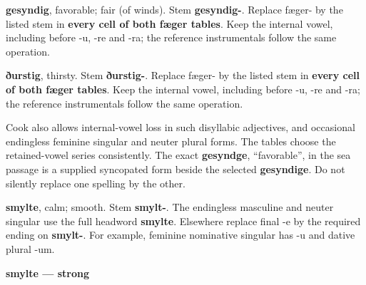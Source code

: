 \textbf{gesyndig}, favorable; fair (of winds). Stem \textbf{gesyndig-}. Replace fæger- by the listed stem in \textbf{every cell of both fæger tables}. Keep the internal vowel, including before -u, -re and -ra; the reference instrumentals follow the same operation.

\textbf{ðurstig}, thirsty. Stem \textbf{ðurstig-}. Replace fæger- by the listed stem in \textbf{every cell of both fæger tables}. Keep the internal vowel, including before -u, -re and -ra; the reference instrumentals follow the same operation.

Cook also allows internal-vowel loss in such disyllabic adjectives, and occasional endingless feminine singular and neuter plural forms. The tables choose the retained-vowel series consistently. The exact \textbf{gesyndge}, “favorable”, in the sea passage is a supplied syncopated form beside the selected \textbf{gesyndige}. Do not silently replace one spelling by the other.

\textbf{smylte}, calm; smooth. Stem \textbf{smylt-}. The endingless masculine and neuter singular use the full headword \textbf{smylte}. Elsewhere replace final -e by the required ending on \textbf{smylt-}. For example, feminine nominative singular has -u and dative plural -um.

\textbf{smylte — strong}

